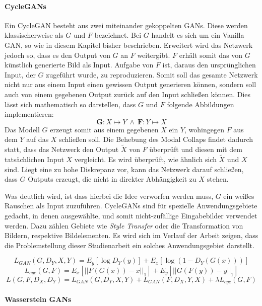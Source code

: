 \paragraph{CycleGANs}
Ein \ac{CycleGAN} besteht aus zwei miteinander gekoppelten \acp{GAN}. Diese werden klassischerweise als $G$ und $F$ bezeichnet. Bei $G$ handelt es sich um ein Vanilla \ac{GAN}, so wie in diesem Kapitel bisher beschrieben. Erweitert wird das Netzwerk jedoch so, dass es den Output von $G$ an $F$ weitergibt. $F$ erhält somit das von $G$ künstlich generierte Bild als Input. Aufgabe von $F$ ist, daraus den ursprünglichen Input, der $G$ zugeführt wurde, zu reproduzieren. Somit soll das gesamte Netzwerk nicht nur aus einem Input einen gewissen Output generieren können, sondern soll auch von einem gegebenen Output zurück auf den Input schließen können. Dies lässt sich mathematisch so darstellen, dass $G$ und $F$ folgende Abbildungen implementieren:
\begin{equation}
	\mathbf{G}: X\mapsto Y \: \wedge \: \mathbf{F}: Y\mapsto X
\end{equation}
Das Modell $G$ erzeugt somit aus einem gegebenen $X$ ein $Y$, wohingegen $F$ aus dem $Y$ auf das $X$ schließen soll. Die Behebung des Modal Collaps findet dadurch statt, dass das Netzwerk den Output $\tilde{X}$ von $F$ überprüft und diesen mit dem tatsächlichen Input $X$ vergleicht. Es wird überprüft, wie ähnlich sich $\tilde{X}$ und $X$ sind. Liegt eine zu hohe Diskrepanz vor, kann das Netzwerk darauf schließen, dass $G$ Outputs erzeugt, die nicht in direkter Abhängigkeit zu $X$ stehen. 

Was deutlich wird, ist dass hierbei die Idee verworfen werden muss, $G$ ein weißes Rauschen als Input zuzuführen. \acp{CycleGAN} sind für spezielle Anwendungsgebiete gedacht, in denen ausgewählte, und somit nicht-zufällige Eingabebilder verwendet werden. Dazu zählen Gebiete wie \emph{Style Transfer} oder die Transformation von Bildern, respektive Bildelementen. Es wird sich im Verlauf der Arbeit zeigen, dass die Problemstellung dieser Studienarbeit ein solches Anwendungsgebiet darstellt.

\begin{equation}
	L_{GAN}(G, D_Y, X, Y) = E_y[\log{D_Y(y)}] + E_x[\log(1-D_Y(G(x)))]
\end{equation}
\begin{equation}
	L_{cyc}(G, F) = E_x[||F(G(x))-x||_1] + E_y[||G(F(y))-y||_1]
\end{equation}
\begin{equation}
	L(G, F, D_X, D_Y) = L_{GAN}(G, D_Y, X, Y) + L_{GAN}(F, D_X, Y, X) + \lambda L_{cyc}(G, F)
\end{equation}
\cite{cycleGAN}
\paragraph{Wasserstein GANs}

\cite{DeepLearningBook}
\cite{visualApproach}